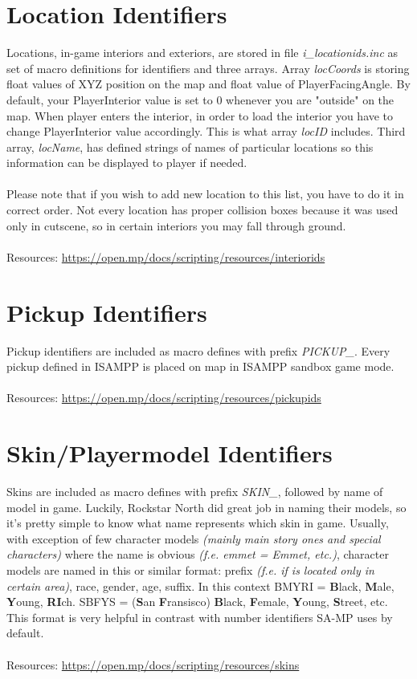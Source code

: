 \documentclass{article}
\begin{document}
\section{Location Identifiers}
Locations, in-game interiors and exteriors, are stored in file \textit{i\_locationids.inc} as set of macro definitions for identifiers and three arrays. Array \textit{locCoords} is storing float values of XYZ position on the map and float value of PlayerFacingAngle. By default, your PlayerInterior value is set to 0 whenever you are "outside" on the map. When player enters the interior, in order to load the interior you have to change PlayerInterior value accordingly. This is what array \textit{locID} includes. Third array, \textit{locName}, has defined strings of names of particular locations so this information can be displayed to player if needed.\\
\\
Please note that if you wish to add new location to this list, you have to do it in correct order. Not every location has proper collision boxes because it was used only in cutscene, so in certain interiors you may fall through ground.
\\
\\Resources: \url{https://open.mp/docs/scripting/resources/interiorids}


\section{Pickup Identifiers}
Pickup identifiers are included as macro defines with prefix \textit{PICKUP\_}. Every pickup defined in ISAMPP is placed on map in ISAMPP sandbox game mode.
\\
\\Resources: \url{https://open.mp/docs/scripting/resources/pickupids}


\section{Skin/Playermodel Identifiers}
Skins are included as macro defines with prefix \textit{SKIN\_}, followed by name of model in game. Luckily, Rockstar North did great job in naming their models, so it's pretty simple to know what name represents which skin in game. Usually, with exception of few character models \textit{(mainly main story ones and special characters)} where the name is obvious \textit{(f.e. emmet = Emmet, etc.)}, character models are named in this or similar format: prefix \textit{(f.e. if is located only in certain area)}, race, gender, age, suffix. In this context BMYRI = \textbf{B}lack, \textbf{M}ale, \textbf{Y}oung, \textbf{RI}ch. SBFYS = (\textbf{S}an \textbf{F}ransisco) \textbf{B}lack, \textbf{F}emale, \textbf{Y}oung, \textbf{S}treet, etc. This format is very helpful in contrast with number identifiers SA-MP uses by default.
\\
\\Resources: \url{https://open.mp/docs/scripting/resources/skins}
\end{document}
